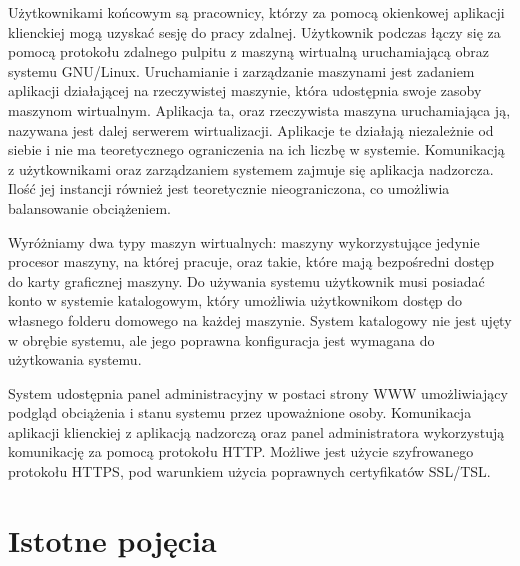 \documentclass[../praca-dyplomowa.tex]{subfiles}
\begin{document}
Użytkownikami końcowym są pracownicy, którzy za pomocą okienkowej aplikacji klienckiej mogą uzyskać sesję do pracy zdalnej. Użytkownik podczas łączy się za pomocą protokołu zdalnego pulpitu z maszyną wirtualną uruchamiającą obraz systemu GNU/Linux. Uruchamianie i zarządzanie maszynami jest zadaniem aplikacji działającej na rzeczywistej maszynie, która udostępnia swoje zasoby maszynom wirtualnym. Aplikacja ta, oraz rzeczywista maszyna uruchamiająca ją, nazywana jest dalej serwerem wirtualizacji. Aplikacje te działają niezależnie od siebie i nie ma teoretycznego ograniczenia na ich liczbę w systemie. Komunikacją z użytkownikami oraz zarządzaniem systemem zajmuje się aplikacja nadzorcza. Ilość jej instancji również jest teoretycznie nieograniczona, co umożliwia balansowanie obciążeniem.

Wyróżniamy dwa typy maszyn wirtualnych: maszyny wykorzystujące jedynie procesor maszyny, na której pracuje, oraz takie, które mają bezpośredni dostęp do karty graficznej maszyny. Do używania systemu użytkownik musi posiadać konto w systemie katalogowym, który umożliwia użytkownikom dostęp do własnego folderu domowego na każdej maszynie. System katalogowy nie jest ujęty w obrębie systemu, ale jego poprawna konfiguracja jest wymagana do użytkowania systemu.

System udostępnia panel administracyjny w postaci strony WWW umożliwiający podgląd obciążenia i stanu systemu przez upoważnione osoby. Komunikacja aplikacji klienckiej z aplikacją nadzorczą oraz panel administratora wykorzystują komunikację za pomocą protokołu HTTP. Możliwe jest użycie szyfrowanego protokołu HTTPS, pod warunkiem użycia poprawnych certyfikatów SSL/TSL.

\section{Istotne pojęcia}
\end{document}
